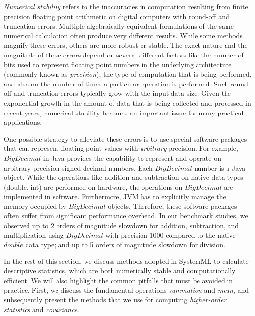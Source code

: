
{\em Numerical stability} refers to the inaccuracies in computation resulting from finite precision floating point arithmetic on digital computers with round-off and truncation errors. Multiple algebraically equivalent formulations of the same numerical calculation often produce very different results. While some methods magnify these errors, others are more robust or stable. The exact nature and the magnitude of these errors depend on several different factors like the number of bits used to represent floating point numbers in the underlying architecture (commonly known as {\em precision}), the type of computation that is being performed, and also on the number of times a particular operation is performed. Such round-off and truncation errors typically grow with the input data size. Given the exponential growth in the amount of data that is being collected and processed in recent years, numerical stability becomes an important issue for many practical applications. 

One possible strategy to alleviate these errors is to use special software packages that can represent floating point values with {\em arbitrary} precision. For example, $BigDecimal$ in Java provides the capability to represent and operate on arbitrary-precision signed decimal numbers. Each $BigDecimal$ number is a Java object. While the operations like addition and subtraction on native data types (double, int) are performed on hardware, the operations on $BigDecimal$ are implemented in software. Furthermore, JVM has to explicitly manage the memory occupied by $BigDecimal$ objects. Therefore, these software packages often suffer from significant performance overhead. In our benchmark studies, we observed up to 2 orders of magnitude slowdown for addition, subtraction, and multiplication using $BigDecimal$ with precision $1000$ compared to the native $double$ data type; and up to 5 orders of magnitude slowdown for division.

In the rest of this section, we discuss methods adopted in SystemML to calculate descriptive statistics, which are both numerically stable and computationally efficient. We will also highlight the common pitfalls that must be avoided in practice. First, we discuss the fundamental operations {\em summation} and {\em mean}, and subsequently present the methods that we use for computing {\em higher-order statistics} and {\em covariance}.



